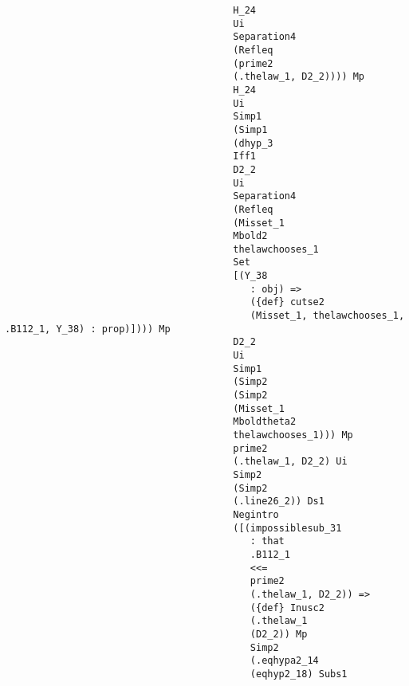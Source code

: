 \documentclass[12pt]{article}
\begin{document}
\begin{verbatim}
                                        H_24 
                                        Ui 
                                        Separation4 
                                        (Refleq 
                                        (prime2 
                                        (.thelaw_1, D2_2)))) Mp 
                                        H_24 
                                        Ui 
                                        Simp1 
                                        (Simp1 
                                        (dhyp_3 
                                        Iff1 
                                        D2_2 
                                        Ui 
                                        Separation4 
                                        (Refleq 
                                        (Misset_1 
                                        Mbold2 
                                        thelawchooses_1 
                                        Set 
                                        [(Y_38 
                                           : obj) => 
                                           ({def} cutse2 
                                           (Misset_1, thelawchooses_1, .B112_1, Y_38) : prop)]))) Mp 
                                        D2_2 
                                        Ui 
                                        Simp1 
                                        (Simp2 
                                        (Simp2 
                                        (Misset_1 
                                        Mboldtheta2 
                                        thelawchooses_1))) Mp 
                                        prime2 
                                        (.thelaw_1, D2_2) Ui 
                                        Simp2 
                                        (Simp2 
                                        (.line26_2)) Ds1 
                                        Negintro 
                                        ([(impossiblesub_31 
                                           : that 
                                           .B112_1 
                                           <<= 
                                           prime2 
                                           (.thelaw_1, D2_2)) => 
                                           ({def} Inusc2 
                                           (.thelaw_1 
                                           (D2_2)) Mp 
                                           Simp2 
                                           (.eqhypa2_14 
                                           (eqhyp2_18) Subs1 

\end{verbatim}
\end{document}
